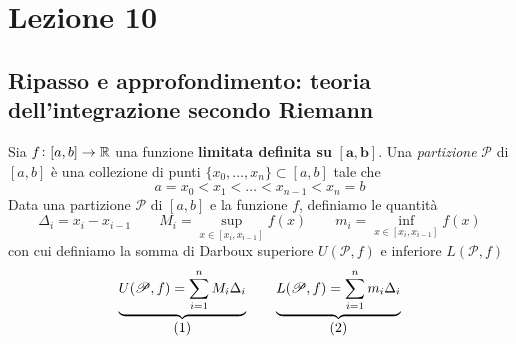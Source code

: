 \section{Lezione 10}
\subsection{Ripasso e approfondimento: teoria dell'integrazione secondo Riemann}
\begin{definition}
    \label{def:8.1}
    Sia $f\colon[a,b]\to\amsbb{R}$ una funzione \textbf{limitata definita su} $\mathbf{[a,b]}$. Una \emph{partizione} $\mathscr{P}$ di $[a,b]$ è una collezione di punti $\{x_0, \dots, x_n\}\subset [a,b]$ tale che
    \[
    a=x_0 < x_1 < \dots < x_{n-1}<x_n= b
    \]
    Data una partizione $\mathscr{P}$ di $[a,b]$ e la funzione $f$, definiamo le quantità
    \begin{equation}
        \label{eq:8.1}
        \Delta_i = x_i - x_{i-1} \qquad M_i = \sup_{x\in[x_i, x_{i-1}]} f(x) \qquad m_i = \inf_{x\in[x_i, x_{i-1}]} f(x)
    \end{equation}
    con cui definiamo la somma di Darboux superiore $U(\mathscr{P}, f)$ e inferiore $L(\mathscr{P},f)$
    \[
    \underbrace{U(\mathscr{P},f) = \sum_{i=1}^n M_i \Delta_i}_{\stepcounter{equation}\mbox{(\theequation)}} \qquad \underbrace{L(\mathscr{P},f) = \sum_{i=1}^n m_i \Delta_i}_{\stepcounter{equation}\mbox{(\theequation)}}
    \]
    \addtocounter{equation}{-2}\label{eq:8.2}
    \addtocounter{equation}{0}\label{eq:8.3}
\end{definition}
